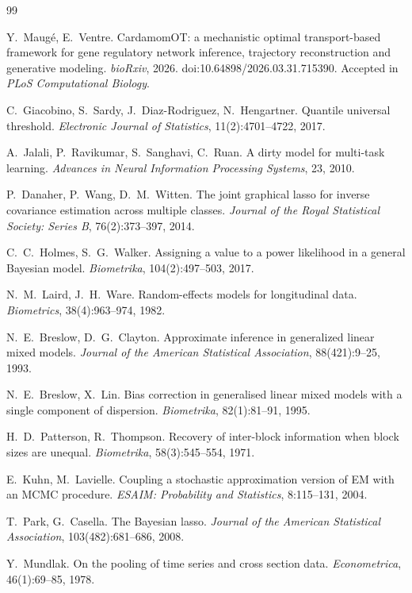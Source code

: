 \documentclass[a4paper, 11pt]{article}
\theoremstyle{plain}
\theoremstyle{remark}
\begin{document}
\begin{thebibliography}{99}

Y.~Maugé, E.~Ventre.
\newblock CardamomOT: a mechanistic optimal transport-based framework for gene regulatory network inference, trajectory reconstruction and generative modeling.
\newblock \emph{bioRxiv}, 2026. doi:10.64898/2026.03.31.715390. Accepted in \emph{PLoS Computational Biology}.

C.~Giacobino, S.~Sardy, J.~Diaz-Rodriguez, N.~Hengartner.
\newblock Quantile universal threshold.
\newblock \emph{Electronic Journal of Statistics}, 11(2):4701--4722, 2017.

A.~Jalali, P.~Ravikumar, S.~Sanghavi, C.~Ruan.
\newblock A dirty model for multi-task learning.
\newblock \emph{Advances in Neural Information Processing Systems}, 23, 2010.

P.~Danaher, P.~Wang, D.~M.~Witten.
\newblock The joint graphical lasso for inverse covariance estimation across multiple classes.
\newblock \emph{Journal of the Royal Statistical Society: Series B}, 76(2):373--397, 2014.

C.~C.~Holmes, S.~G.~Walker.
\newblock Assigning a value to a power likelihood in a general Bayesian model.
\newblock \emph{Biometrika}, 104(2):497--503, 2017.

N.~M.~Laird, J.~H.~Ware.
\newblock Random-effects models for longitudinal data.
\newblock \emph{Biometrics}, 38(4):963--974, 1982.

N.~E.~Breslow, D.~G.~Clayton.
\newblock Approximate inference in generalized linear mixed models.
\newblock \emph{Journal of the American Statistical Association}, 88(421):9--25, 1993.

N.~E.~Breslow, X.~Lin.
\newblock Bias correction in generalised linear mixed models with a single component of dispersion.
\newblock \emph{Biometrika}, 82(1):81--91, 1995.

H.~D.~Patterson, R.~Thompson.
\newblock Recovery of inter-block information when block sizes are unequal.
\newblock \emph{Biometrika}, 58(3):545--554, 1971.

E.~Kuhn, M.~Lavielle.
\newblock Coupling a stochastic approximation version of EM with an MCMC procedure.
\newblock \emph{ESAIM: Probability and Statistics}, 8:115--131, 2004.

T.~Park, G.~Casella.
\newblock The Bayesian lasso.
\newblock \emph{Journal of the American Statistical Association}, 103(482):681--686, 2008.

Y.~Mundlak.
\newblock On the pooling of time series and cross section data.
\newblock \emph{Econometrica}, 46(1):69--85, 1978.

\end{thebibliography}
\end{document}
